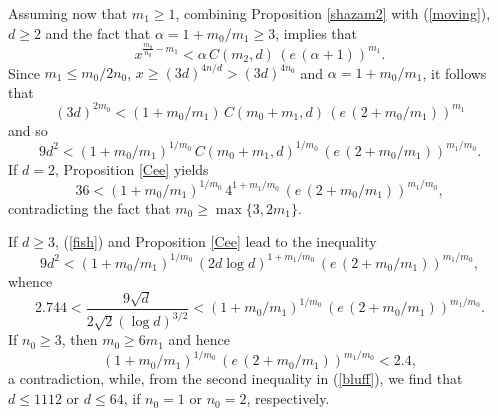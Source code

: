 Assuming now that $m_1 \geq 1$, combining  Proposition \ref{shazam2} with (\ref{moving}), $d \geq 2$ and the fact that $\alpha = 1+m_0/m_1 \geq 3$, implies that
$$
x^{\frac{m_0}{n_0} - m_1} <  \alpha \, C(m_2,d) \, (e \, (\alpha+1))^{m_1}.
$$
Since $m_1 \leq m_0/2n_0$, $x \geq (3d)^{4n/d} > (3d)^{4n_0}$ and $\alpha = 1+m_0/m_1$, it follows that
$$
(3d)^{2m_0} < (1 + m_0/m_1) \,  C(m_0+m_1,d) \,   (e \, (2 + m_0/m_1))^{m_1}
$$
and so
\begin{equation} \label{fish}
9 d^2 < (1 + m_0/m_1)^{1/m_0}  \,  C(m_0+m_1,d)^{1/m_0} \,   (e \, (2 + m_0/m_1))^{m_1/m_0}.
\end{equation}
If $d=2$, Proposition \ref{Cee} yields
\begin{equation} \label{fleece}
36 < (1 + m_0/m_1)^{1/m_0}  \,  4^{1+m_1/m_0} \,   (e \, (2 + m_0/m_1))^{m_1/m_0},
\end{equation}
contradicting  the fact that $m_0 \geq \max \{ 3, 2m_1 \}$.

If $d \geq 3$, (\ref{fish}) and Proposition \ref{Cee}  lead to the inequality
$$
9 d^2 < (1 + m_0/m_1)^{1/m_0}  \,  (2 d \log d)^{1+m_1/m_0} \,   (e \, (2 + m_0/m_1))^{m_1/m_0},
$$
whence
\begin{equation} \label{bluff}
2.744 < \frac{9 \sqrt{d}}{2 \sqrt{2} (\log d)^{3/2}} < (1 + m_0/m_1)^{1/m_0}  \,  (e \, (2 + m_0/m_1))^{m_1/m_0}.
\end{equation}
If $n_0 \geq 3$, then $m_0 \geq 6 m_1$ and hence 
$$
(1 + m_0/m_1)^{1/m_0}  \,  (e \, (2 + m_0/m_1))^{m_1/m_0} < 2.4,
$$
a contradiction, while, from the second inequality in (\ref{bluff}), we find that  $d \leq 1112$ or $d \leq 64$, if $n_0=1$ or $n_0=2$, respectively. 

